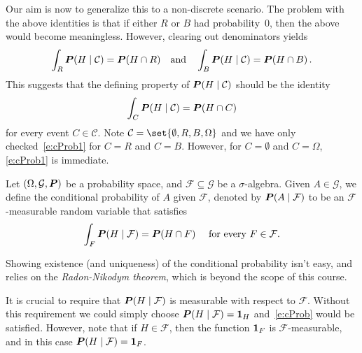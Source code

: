 Our aim is now to generalize this to a non-discrete scenario.
The problem with the above identities is that if either $R$ or $B$ had probability~$0$, then the above would become meaningless.
However, clearing out denominators yields
\begin{equation*}
  \int_R \P( H \given \mathcal C) = \P( H \cap R )
  \quad\text{and}\quad
  \int_B \P( H \given \mathcal C) = \P( H \cap B )\,.
\end{equation*}
This suggests that the defining property of $\P( H \given \mathcal C)$ should be the identity
\begin{equation}\label{e:cProb1}
  \int_C \P( H \given \mathcal C) = \P( H \cap C )
\end{equation}
for every event $C \in \mathcal C$.
Note $\mathcal C = \set{ \emptyset, R, B, \Omega }$ and we have only checked~\eqref{e:cProb1} for $C = R$ and $C = B$.
However, for $C = \emptyset$ and $C = \Omega$, \eqref{e:cProb1} is immediate.

\begin{definition}
  Let $(\Omega, \mathcal G, \P)$ be a probability space, and $\mathcal F \subseteq \mathcal G$ be a $\sigma$-algebra.
  Given $A \in \mathcal G$, we define the conditional probability of $A$ given $\mathcal F$, denoted by $\P( A \given \mathcal F)$ to be an $\mathcal F$-measurable random variable that satisfies 
  \begin{equation}\label{e:cProb}
    \int_F \P( H \given \mathcal F) = \P( H \cap F )
    \quad\text{ for every } F \in \mathcal F.
  \end{equation}
\end{definition}

\begin{remark}
  Showing existence (and uniqueness) of the conditional probability isn't easy, and relies on the \emph{Radon-Nikodym theorem}, which is beyond the scope of this course.
\end{remark}

\begin{remark}
  It is crucial to require that $\P( H \given \mathcal F )$ is measurable with respect to $\mathcal F$.
  Without this requirement we could simply choose $\P( H \given \mathcal F) = \one_H$ and~\eqref{e:cProb} would be satisfied.
  However, note that if $H \in \mathcal F$, then the function $\one_F$ is $\mathcal F$-measurable, and in this case $\P( H \given \mathcal F ) = \one_F$.
\end{remark}

